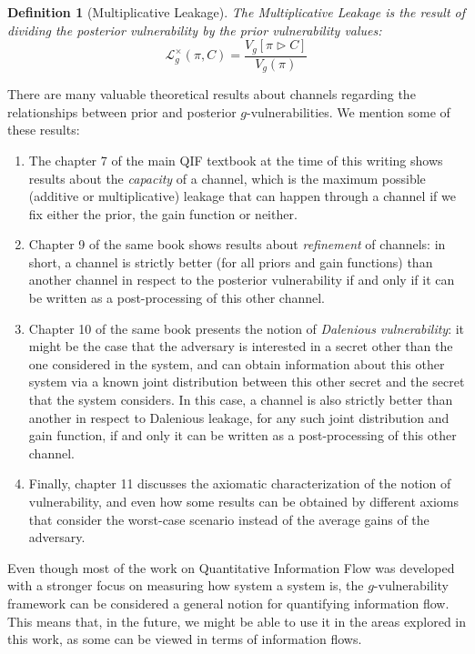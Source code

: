 \documentclass[conference]{IEEEtran}
\newtheorem{definition}{Definition}
\begin{document}
\begin{definition}[Multiplicative Leakage]
The \emph{Multiplicative Leakage} is the result of dividing the posterior vulnerability by the prior vulnerability values:
$$\mathcal{L}_g^\times(\pi,C) = \frac{V_g[\pi\triangleright C]}{V_g(\pi)}$$
\end{definition}

There are many valuable theoretical results about channels regarding the relationships between prior and posterior $g$-vulnerabilities. We mention some of these results:

\begin{enumerate}
\item The chapter 7 of the main QIF textbook at the time of this writing \cite[Chapter~7]{QIF} shows results about the \emph{capacity} of a channel, which is the maximum possible (additive or multiplicative) leakage that can happen through a channel if we fix either the prior, the gain function or neither.
\item Chapter 9 of the same book \cite[Chapter~9]{QIF} shows results about \emph{refinement} of channels: in short, a channel is strictly better (for all priors and gain functions) than another channel in respect to the posterior vulnerability if and only if it can be written as a post-processing of this other channel.
\item Chapter 10 of the same book \cite[Chapter~10]{QIF} presents the notion of \emph{Dalenious vulnerability}: it might be the case that the adversary is interested in a secret other than the one considered in the system, and can obtain information about this other system via a known joint distribution between this other secret and the secret that the system considers. In this case, a channel is also strictly better than another in respect to Dalenious leakage, for any such joint distribution and gain function, if and only it can be written as a post-processing of this other channel.
\item Finally, chapter 11 \cite[Chapter~11]{QIF} discusses the axiomatic characterization of the notion of vulnerability, and even how some results can be obtained by different axioms that consider the worst-case scenario instead of the average gains of the adversary.
\end{enumerate}

Even though most of the work on Quantitative Information Flow was developed with a stronger focus on measuring how system a system is, the $g$-vulnerability framework can be considered a general notion for quantifying information flow. This means that, in the future, we might be able to use it in the areas explored in this work, as some can be viewed in terms of information flows.
\end{document}

